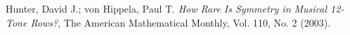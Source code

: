 \begin{thebibliography}{00}
%			
%			
%					
%			
			
%			
			{ Hunter, David J.; von Hippela, Paul T.}
			\textit{How Rare Is Symmetry in Musical 12-Tone Rows?},
			The American Mathematical Monthly, Vol. 110, No. 2
			(2003).
%			
%			
%			
%			
%			
			

\end{thebibliography}
